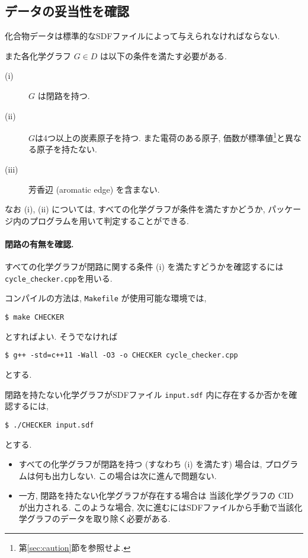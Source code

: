 \documentclass[11pt, titlepage, dvipdfmx, twoside]{jarticle}
\newcommand{\secref}[1]{第\ref{sec:#1}節}
\begin{document}
\subsection{データの妥当性を確認}
化合物データは標準的なSDFファイルによって与えられなければならない.

また各化学グラフ $G\in D$ は以下の条件を満たす必要がある.
\begin{description}
\item[(i)] $G$ は閉路を持つ.
\item[(ii)] $G$は4つ以上の炭素原子を持つ.
  また電荷のある原子, 価数が標準値\footnote{\secref{caution}を参照せよ.}と異なる原子を持たない.
\item[(iii)] 芳香辺 (aromatic edge) を含まない. 
\end{description}
なお (i), (ii) については,
すべての化学グラフが条件を満たすかどうか,
パッケージ内のプログラムを用いて判定することができる. 


\paragraph{閉路の有無を確認.}
すべての化学グラフが閉路に関する条件 (i) を満たすどうかを確認するには 
          {\tt cycle\_checker.cpp}を用いる.

コンパイルの方法は, {\tt Makefile} が使用可能な環境では, 
\begin{oframed}
{\small
\verb|$ make CHECKER|
}
\end{oframed}
とすればよい. そうでなければ
\begin{oframed}
{\small
\verb|$ g++ -std=c++11 -Wall -O3 -o CHECKER cycle_checker.cpp|
}
\end{oframed}
とする.

閉路を持たない化学グラフがSDFファイル
{\tt input.sdf} 内に存在するか否かを確認するには,
\begin{oframed}
{\small
\verb|$ ./CHECKER input.sdf|
}
\end{oframed}
とする.

\begin{itemize}
  \item すべての化学グラフが閉路を持つ (すなわち (i) を満たす) 場合は,
    プログラムは何も出力しない. この場合は次に進んで問題ない.
  \item 一方, 閉路を持たない化学グラフが存在する場合は
    当該化学グラフの CID が出力される. このような場合,
    次に進むにはSDFファイルから手動で当該化学グラフのデータを取り除く必要がある. 
\end{itemize}
\end{document}
